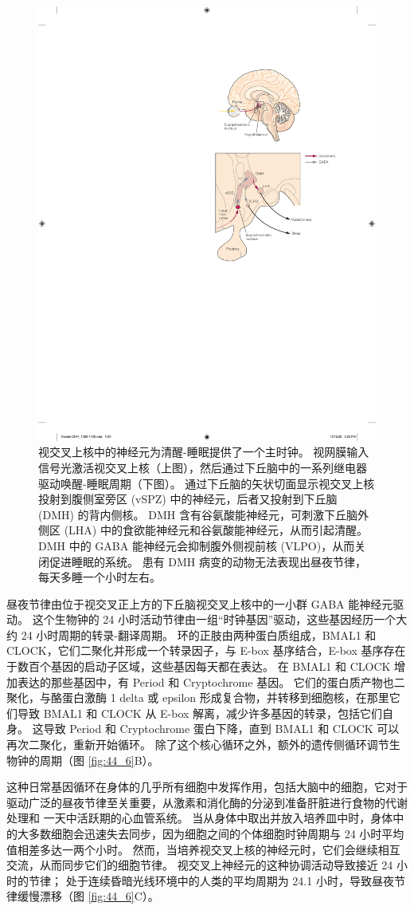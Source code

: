 \begin{figure}[htbp]
	\centering
	\includegraphics[width=0.5\linewidth]{chap44/fig_44_7}
	\caption{视交叉上核中的神经元为清醒-睡眠提供了一个主时钟。 视网膜输入信号光激活视交叉上核（上图），然后通过下丘脑中的一系列继电器驱动唤醒-睡眠周期（下图）。 通过下丘脑的矢状切面显示视交叉上核投射到腹侧室旁区 (vSPZ) 中的神经元，后者又投射到下丘脑 (DMH) 的背内侧核。 DMH 含有谷氨酸能神经元，可刺激下丘脑外侧区 (LHA) 中的食欲能神经元和谷氨酸能神经元，从而引起清醒。 DMH 中的 GABA 能神经元会抑制腹外侧视前核 (VLPO)，从而关闭促进睡眠的系统。 患有 DMH 病变的动物无法表现出昼夜节律，每天多睡一个小时左右。}
	\label{fig:44_7}
\end{figure}


昼夜节律由位于视交叉正上方的下丘脑视交叉上核中的一小群 GABA 能神经元驱动。
这个生物钟的 24 小时活动节律由一组“时钟基因”驱动，这些基因经历一个大约 24 小时周期的转录-翻译周期。
环的正肢由两种蛋白质组成，BMAL1 和 CLOCK，它们二聚化并形成一个转录因子，与 E-box 基序结合，E-box 基序存在于数百个基因的启动子区域，这些基因每天都在表达。
在 BMAL1 和 CLOCK 增加表达的那些基因中，有 Period 和 Cryptochrome 基因。
它们的蛋白质产物也二聚化，与酪蛋白激酶 1 delta 或 epsilon 形成复合物，并转移到细胞核，在那里它们导致 BMAL1 和 CLOCK 从 E-box 解离，减少许多基因的转录，包括它们自身。
这导致 Period 和 Cryptochrome 蛋白下降，直到 BMAL1 和 CLOCK 可以再次二聚化，重新开始循环。
除了这个核心循环之外，额外的遗传侧循环调节生物钟的周期（图 \ref{fig:44_6}B）。


这种日常基因循环在身体的几乎所有细胞中发挥作用，包括大脑中的细胞，它对于驱动广泛的昼夜节律至关重要，从激素和消化酶的分泌到准备肝脏进行食物的代谢处理和 一天中活跃期的心血管系统。
当从身体中取出并放入培养皿中时，身体中的大多数细胞会迅速失去同步，因为细胞之间的个体细胞时钟周期与 24 小时平均值相差多达一两个小时。
然而，当培养视交叉上核的神经元时，它们会继续相互交流，从而同步它们的细胞节律。
视交叉上神经元的这种协调活动导致接近 24 小时的节律；
处于连续昏暗光线环境中的人类的平均周期为 24.1 小时，导致昼夜节律缓慢漂移（图 \ref{fig:44_6}C）。


